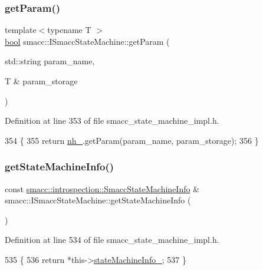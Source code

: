 \subsubsection{\texorpdfstring{get\+Param()}{getParam()}}
{\footnotesize\ttfamily template$<$typename T $>$ \\
\hyperlink{classbool}{bool} smacc\+::\+I\+Smacc\+State\+Machine\+::get\+Param (\begin{DoxyParamCaption}\item[{std\+::string}]{param\+\_\+name,  }\item[{T \&}]{param\+\_\+storage }\end{DoxyParamCaption})\hspace{0.3cm}{\ttfamily [protected]}}



Definition at line 353 of file smacc\+\_\+state\+\_\+machine\+\_\+impl.\+h.


\begin{DoxyCode}
354   \{
355     \textcolor{keywordflow}{return} \hyperlink{classsmacc_1_1ISmaccStateMachine_ad8877bcca9dbb345fe72cca839c93dd3}{nh\_}.getParam(param\_name, param\_storage);
356   \}
\end{DoxyCode}
\mbox{\label{classsmacc_1_1ISmaccStateMachine_a3b1facb0477325fe43b447fc21d9eb7d}} 
\subsubsection{\texorpdfstring{get\+State\+Machine\+Info()}{getStateMachineInfo()}}
{\footnotesize\ttfamily const \hyperlink{classsmacc_1_1introspection_1_1SmaccStateMachineInfo}{smacc\+::introspection\+::\+Smacc\+State\+Machine\+Info} \& smacc\+::\+I\+Smacc\+State\+Machine\+::get\+State\+Machine\+Info (\begin{DoxyParamCaption}{ }\end{DoxyParamCaption})\hspace{0.3cm}{\ttfamily [inline]}}



Definition at line 534 of file smacc\+\_\+state\+\_\+machine\+\_\+impl.\+h.


\begin{DoxyCode}
535   \{
536     \textcolor{keywordflow}{return} *this->\hyperlink{classsmacc_1_1ISmaccStateMachine_a0914aa27c3f51374c338d89a32b135d1}{stateMachineInfo\_};
537   \}
\end{DoxyCode}
\mbox{\label{classsmacc_1_1ISmaccStateMachine_a2d0b1742f17dd77d5df217153e8b5259}} 
